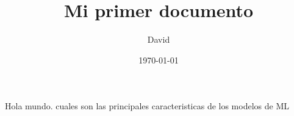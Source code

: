 \documentclass{article}
\title{Mi primer documento}
\author{David}
\date{\today}
\begin{document}
\maketitle

Hola mundo.
cuales son las principales caracteristicas de los modelos de ML
\end{document}
